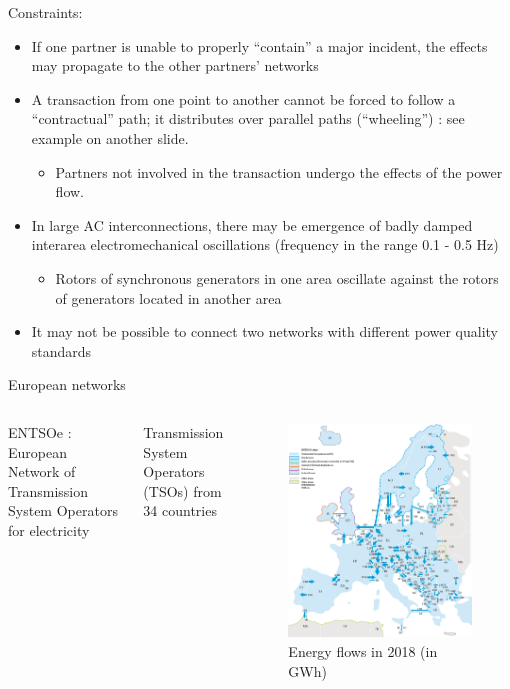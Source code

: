 \begin{frame}
{Constraints:}
\begin{itemize}
\item If one partner is unable to properly “contain” a major incident, the effects may propagate to the other partners’ networks
\item A transaction from one point to another cannot be forced to follow a “contractual” path; it distributes over parallel paths (“wheeling”) : see example on another slide.
\begin{itemize}
\item Partners not involved in the transaction undergo the effects of the power flow.
\end{itemize}
\item In large AC interconnections, there may be emergence of badly damped interarea electromechanical oscillations (frequency in the range 0.1 - 0.5 Hz)
\begin{itemize}
\item Rotors of synchronous generators in one area oscillate against the rotors of generators located in another area
\end{itemize}
\item It may not be possible to connect two networks with different power quality standards
\end{itemize}
\end{frame}

\begin{frame}
{European networks}
\begin{columns}
ENTSOe :
European Network of Transmission System Operators
for electricity
\par{} Transmission System Operators (TSOs) from 34 countries
\begin{figure}
\centering
\includegraphics[width=0.6\linewidth]{images/EU_net_flows.png}
\caption*{Energy flows in 2018 (in GWh)}
\end{figure}
\end{columns}
\end{frame}

